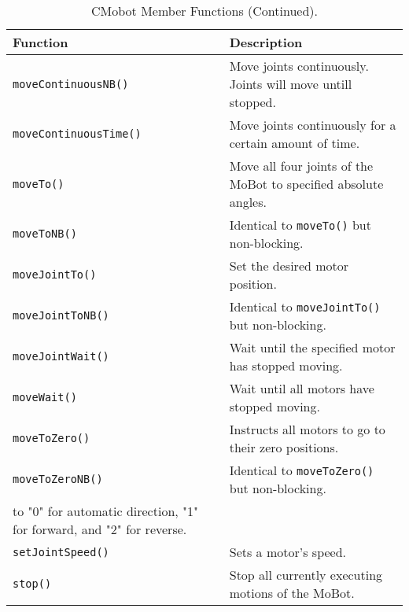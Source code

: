 \addtocounter{table}{-1}
\begin{table}[!H]
\begin{center}
\caption{CMobot Member Functions (Continued).}
\begin{tabular}{p{38 mm}p{77 mm}}
\hline
Function & Description \\
\hline
\texttt{moveContinuousNB()} & Move joints continuously. Joints will move untill stopped.\\
\texttt{moveContinuousTime()} & Move joints continuously for a certain amount of time.\\
\texttt{moveTo()} & Move all four joints of the MoBot to specified absolute angles. \\
\texttt{moveToNB()} & Identical to \texttt{moveTo()} but non-blocking. \\
\texttt{moveJointTo()} & Set the desired motor position. \\
\texttt{moveJointToNB()} & Identical to \texttt{moveJointTo()} but non-blocking. \\
\texttt{moveJointWait()} & Wait until the specified motor has stopped moving. \\
\texttt{moveWait()} & Wait until all motors have stopped moving. \\
\texttt{moveToZero()} & Instructs all motors to go to their zero positions. \\
\texttt{moveToZeroNB()} & Identical to \texttt{moveToZero()} but non-blocking. \\
to "0" for automatic direction, "1" for forward, and "2" for reverse. \\
\texttt{setJointSpeed()} & Sets a motor's speed. \\
\texttt{stop()} & Stop all currently executing motions of the MoBot. \\
\hline
\end{tabular}
\end{center}
\label{mobilec_api_cbinary}
\end{table}

